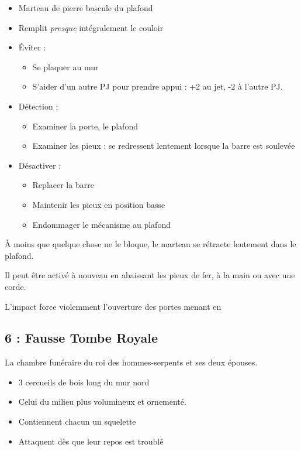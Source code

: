 \begin{highlight}[Le piège]
  \begin{itemize}
    \item Marteau de pierre bascule du plafond
    \item Remplit \emph{presque} intégralement le couloir
    \item \'Eviter :
    \begin{itemize}
      \item Se plaquer au mur
      \item S'aider d'un autre PJ pour prendre appui : +2 au jet, -2 à l'autre PJ.
    \end{itemize}
    \item Détection :
    \begin{itemize}
      \item Examiner la porte, le plafond
      \item Examiner les pieux : se redressent lentement lorsque la barre est soulevée
    \end{itemize}
    \item Désactiver :
    \begin{itemize}
      \item Replacer la barre
      \item Maintenir les pieux en position basse
      \item Endommager le mécanisme au plafond
    \end{itemize}
  \end{itemize}
\end{highlight}


À moins que quelque chose ne le bloque, le marteau se rétracte lentement dans le plafond.
 
Il peut être activé à nouveau en abaissant les pieux de fer, à la main ou avec une corde. 

L’impact force violemment l’ouverture des portes menant en \textbf{}


\subsection{6 : Fausse Tombe Royale}\label{n1:s6}
La chambre funéraire du roi des hommes-serpents et ses deux épouses. 
\begin{itemize}
  \item 3 cercueils de bois long du mur nord 
  \item Celui du milieu plus volumineux et ornementé.
  \item Contiennent chacun un squelette
  \item Attaquent dès que leur repos est troublé
\end{itemize}


